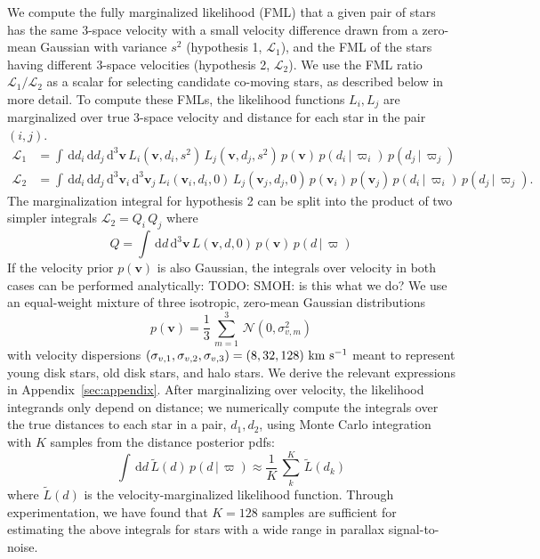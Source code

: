 \documentclass[manuscript, letterpaper]{aastex6}
\newcommand{\given}{\,|\,}
\newcommand{\dd}{\mathrm{d}}
\newcommand{\bs}[1]{\boldsymbol{#1}}
\renewcommand{\vec}[1]{\bs{#1}}
\newcommand{\kms}{\ensuremath{\rm km~s^{-1}}}
\newcommand{\todo}[1]{{\color{red}TODO: #1}}
\begin{document}
We compute the fully marginalized likelihood (FML) that a given pair of stars
has the same 3-space velocity with a small velocity difference drawn from a
zero-mean Gaussian with variance $s^2$ (hypothesis 1, $\mathcal{L}_1$), and
the FML of the stars having different 3-space velocities (hypothesis 2,
$\mathcal{L}_2$).
We use the FML ratio $\mathcal{L}_1/\mathcal{L}_2$ as a scalar for selecting
candidate co-moving stars, as described below in more detail.
To compute these FMLs, the likelihood functions $L_i, L_j$ are marginalized
over true 3-space velocity and distance for each star in the pair $(i,j)$.
\begin{align}
  \mathcal{L}_1 &=
    \int \, \dd d_i \, \dd d_j \, \dd^3 \vec{v} \,
    L_i(\vec{v}, d_i, s^2) \,
    L_j(\vec{v}, d_j, s^2) \,
    p(\vec{v}) \, p(d_i \given \varpi_i) \, p(d_j \given \varpi_j) \\
  \mathcal{L}_2 &=
    \int \, \dd d_i \, \dd d_j \, \dd^3 \vec{v}_i \, \dd^3 \vec{v}_j \,
    L_i(\vec{v}_i, d_i, 0) \,
    L_j(\vec{v}_j, d_j, 0) \,
    p(\vec{v}_i) \, p(\vec{v}_j) \, p(d_i \given \varpi_i) \, p(d_j \given \varpi_j). \label{eq:hyp2}
\end{align}
The marginalization integral for hypothesis 2 can be split into the product of
two simpler integrals $\mathcal{L}_2 = Q_i \, Q_j$ where
\begin{equation}
  Q = \int \, \dd d \, \dd^3 \vec{v} \, L(\vec{v}, d, 0) \, p(\vec{v}) \, p(d\given\varpi)
\end{equation}
If the velocity prior $p(\vec{v})$ is also Gaussian, the integrals over velocity
in both cases can be performed analytically:
\todo{SMOH: is this what we do?}
We use an equal-weight mixture of three isotropic, zero-mean Gaussian
distributions
\begin{equation}
  p(\vec{v}) = \frac{1}{3} \, \sum_{m=1}^3 \, \mathcal{N}(0, \sigma_{v,m}^2)
\end{equation}
with velocity dispersions $(\sigma_{v,1}, \sigma_{v,2}, \sigma_{v,3}) = (8, 32,
128)~\kms$ meant to represent young disk stars, old disk stars, and halo stars.
We derive the relevant expressions in Appendix~\ref{sec:appendix}.
After marginalizing over velocity, the likelihood integrands only depend on
distance; we numerically compute the integrals over the true distances to each
star in a pair, $d_1,d_2$, using Monte Carlo integration with $K$ samples from
the distance posterior pdfs:
\begin{equation}
  \int \, \dd d \, \tilde{L}(d) \, p(d\given\varpi) \approx
    \frac{1}{K} \, \sum_k^K \, \tilde{L}(d_k)
\end{equation}
where $\tilde{L}(d)$ is the velocity-marginalized likelihood function.
Through experimentation, we have found that $K=128$ samples are sufficient for
estimating the above integrals for stars with a wide range in parallax
signal-to-noise.
\end{document}
